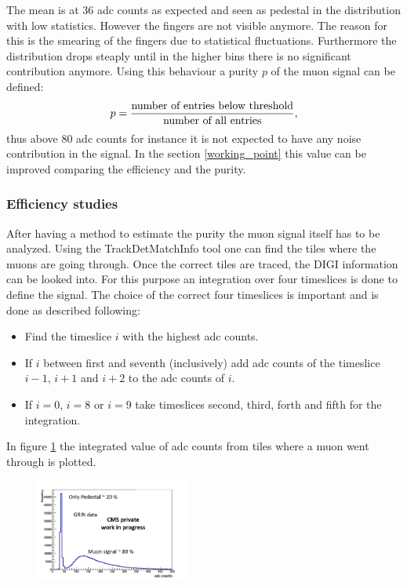 			The mean is at 36 adc counts as expected and seen as pedestal in the distribution with low statistics.
			However the fingers are not visible anymore.
			The reason for this is the smearing of the fingers due to statistical fluctuations.
			Furthermore the distribution drops steaply until in the higher bins there is no significant contribution anymore.
			Using this behaviour a purity $p$ of the muon signal can be defined:
			\begin{equation}
				p = \frac{\textnormal{number of entries below threshold}}{\textnormal{number of all entries}},
			\end{equation}
			thus above 80 adc counts for instance it is not expected to have any noise contribution in the signal.
			In the section \ref{working_point} this value can be improved comparing the efficiency and the purity.
		\subsubsection{Efficiency studies}
			After having a method to estimate the purity the muon signal itself has to be analyzed.
			Using the TrackDetMatchInfo tool one can find the tiles where the muons are going through.
			Once the correct tiles are traced, the DIGI information can be looked into.
			For this purpose an integration over four timeslices is done to define the signal.
			The choice of the correct four timeslices is important and is done as described following:
			\begin{itemize}
			  \item Find the timeslice $i$ with the highest adc counts.
			  \item If $i$ between first and seventh (inclusively) add adc counts of the timeslice $i-1$, $i+1$ and $i+2$ to the adc counts of $i$.
			  \item If $i=0$, $i=8$ or $i=9$ take timeslices second, third, forth and fifth for the integration.
			\end{itemize}
			In figure \ref{fig:efficiency1x1} the integrated value of adc counts from tiles where a muon went through is plotted.
			\begin{figure}[htbp]
				\centering
				\includegraphics[width=0.45\textwidth]{Figures/erdogan/efficiency1x1.png}
				\caption{}
				\label{fig:efficiency1x1}
			\end{figure}
